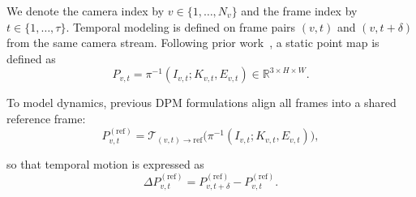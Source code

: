 

We denote the camera index by $v \in \{1,\dots,N_v\}$ and the frame index by $t \in \{1,\dots,\tau\}$. 
Temporal modeling is defined on frame pairs $(v,t)$ and $(v,t+\delta)$ from the same camera stream.
Following prior work~\cite{sucar2025dynamic}, a static point map is defined as
\begin{equation}
P_{v,t} = \pi^{-1}(I_{v,t}; K_{v,t}, E_{v,t}) \in \mathbb{R}^{3 \times H \times W}.
\end{equation}

To model dynamics, previous DPM formulations align all frames into a shared reference frame:
\begin{equation}
P_{v,t}^{(\mathrm{ref})} =
\mathcal{T}_{(v,t)\rightarrow \mathrm{ref}}
\big(\pi^{-1}(I_{v,t};K_{v,t},E_{v,t})\big),
\end{equation}

so that temporal motion is expressed as
\begin{equation}
\Delta P_{v,t}^{(\mathrm{ref})} =
P_{v,t+\delta}^{(\mathrm{ref})}-P_{v,t}^{(\mathrm{ref})}.
\end{equation}

